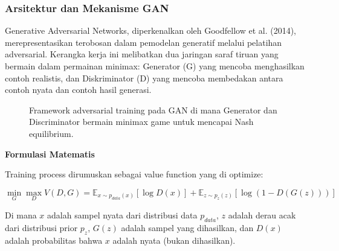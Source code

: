 \documentclass[12pt,a4paper]{article}
\begin{document}
\vspace{1.5ex}

\subsubsection{Arsitektur dan Mekanisme GAN}
\label{subsubsec:gan-architecture}

\vspace{1.5ex}

Generative Adversarial Networks, diperkenalkan oleh Goodfellow et al. (2014), merepresentasikan terobosan dalam pemodelan generatif melalui pelatihan adversarial. Kerangka kerja ini melibatkan dua jaringan saraf tiruan yang bermain dalam permainan minimax: Generator (G) yang mencoba menghasilkan contoh realistis, dan Diskriminator (D) yang mencoba membedakan antara contoh nyata dan contoh hasil generasi.

\begin{figure}[H]
\centering
\caption{Framework adversarial training pada GAN di mana Generator dan Discriminator bermain minimax game untuk mencapai Nash equilibrium.}
\label{fig:gan-framework}
\end{figure}

\textbf{Formulasi Matematis}

Training process dirumuskan sebagai value function yang di optimize:

\begin{equation}
\min_G \max_D V(D, G) = \mathbb{E}_{x \sim p_{data}(x)}[\log D(x)] + \mathbb{E}_{z \sim p_z(z)}[\log(1 - D(G(z)))]
\end{equation}

Di mana $x$ adalah sampel nyata dari distribusi data $p_{data}$, $z$ adalah derau acak dari distribusi prior $p_z$, $G(z)$ adalah sampel yang dihasilkan, dan $D(x)$ adalah probabilitas bahwa $x$ adalah nyata (bukan dihasilkan).
\end{document}
